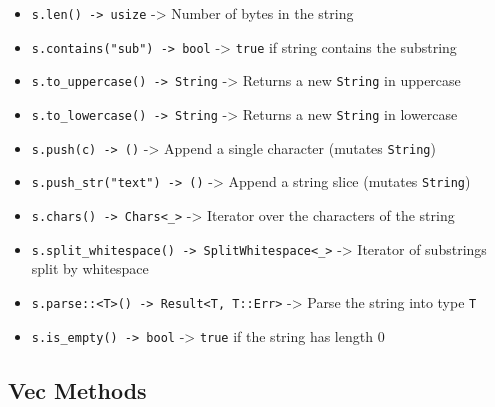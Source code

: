 \documentclass[
  11pt,
]{article}
\providecommand{\tightlist}{%
  \setlength{\itemsep}{0pt}\setlength{\parskip}{0pt}}
\begin{document}
\begin{itemize}
\tightlist
\item
  \texttt{s.len()\ -\textgreater{}\ usize} -\textgreater{} Number of
  bytes in the string
\item
  \texttt{s.contains("sub")\ -\textgreater{}\ bool} -\textgreater{}
  \texttt{true} if string contains the substring
\item
  \texttt{s.to\_uppercase()\ -\textgreater{}\ String} -\textgreater{}
  Returns a new \texttt{String} in uppercase
\item
  \texttt{s.to\_lowercase()\ -\textgreater{}\ String} -\textgreater{}
  Returns a new \texttt{String} in lowercase
\item
  \texttt{s.push(\textquotesingle{}c\textquotesingle{})\ -\textgreater{}\ ()}
  -\textgreater{} Append a single character (mutates \texttt{String})
\item
  \texttt{s.push\_str("text")\ -\textgreater{}\ ()} -\textgreater{}
  Append a string slice (mutates \texttt{String})
\item
  \texttt{s.chars()\ -\textgreater{}\ Chars\textless{}\textquotesingle{}\_\textgreater{}}
  -\textgreater{} Iterator over the characters of the string
\item
  \texttt{s.split\_whitespace()\ -\textgreater{}\ SplitWhitespace\textless{}\textquotesingle{}\_\textgreater{}}
  -\textgreater{} Iterator of substrings split by whitespace
\item
  \texttt{s.parse::\textless{}T\textgreater{}()\ -\textgreater{}\ Result\textless{}T,\ T::Err\textgreater{}}
  -\textgreater{} Parse the string into type \texttt{T}
\item
  \texttt{s.is\_empty()\ -\textgreater{}\ bool} -\textgreater{}
  \texttt{true} if the string has length 0
\end{itemize}

\subsection{Vec Methods}\label{vec-methods}
\end{document}
